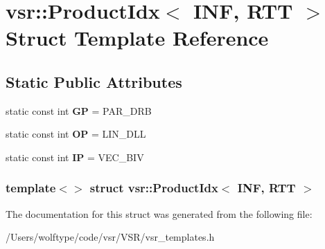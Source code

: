 \hypertarget{structvsr_1_1_product_idx_3_01_i_n_f_00_01_r_t_t_01_4}{\section{vsr\-:\-:Product\-Idx$<$ I\-N\-F, R\-T\-T $>$ Struct Template Reference}
\label{structvsr_1_1_product_idx_3_01_i_n_f_00_01_r_t_t_01_4}
}
\subsection*{Static Public Attributes}
\begin{DoxyCompactItemize}
\item 
\hypertarget{structvsr_1_1_product_idx_3_01_i_n_f_00_01_r_t_t_01_4_a5d0f209143561a60a6deb1886f94f396}{static const int {\bfseries G\-P} = P\-A\-R\-\_\-\-D\-R\-B}\label{structvsr_1_1_product_idx_3_01_i_n_f_00_01_r_t_t_01_4_a5d0f209143561a60a6deb1886f94f396}

\item 
\hypertarget{structvsr_1_1_product_idx_3_01_i_n_f_00_01_r_t_t_01_4_af1774688c30c0994388f69dfba151e16}{static const int {\bfseries O\-P} = L\-I\-N\-\_\-\-D\-L\-L}\label{structvsr_1_1_product_idx_3_01_i_n_f_00_01_r_t_t_01_4_af1774688c30c0994388f69dfba151e16}

\item 
\hypertarget{structvsr_1_1_product_idx_3_01_i_n_f_00_01_r_t_t_01_4_a9f800a200cafab8fbe589baab8935832}{static const int {\bfseries I\-P} = V\-E\-C\-\_\-\-B\-I\-V}\label{structvsr_1_1_product_idx_3_01_i_n_f_00_01_r_t_t_01_4_a9f800a200cafab8fbe589baab8935832}

\end{DoxyCompactItemize}
\subsubsection*{template$<$$>$ struct vsr\-::\-Product\-Idx$<$ I\-N\-F, R\-T\-T $>$}



The documentation for this struct was generated from the following file\-:\begin{DoxyCompactItemize}
\item 
/\-Users/wolftype/code/vsr/\-V\-S\-R/vsr\-\_\-templates.\-h\end{DoxyCompactItemize}
